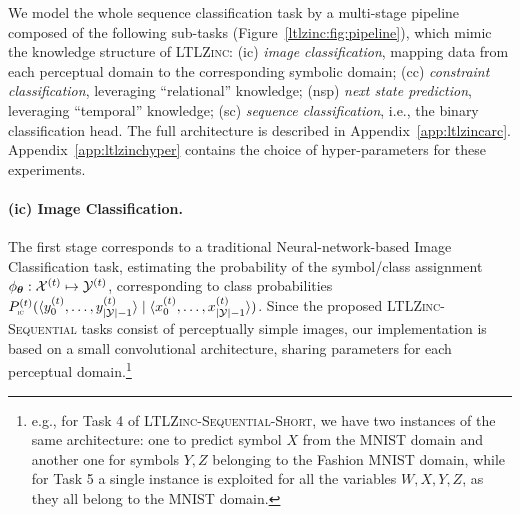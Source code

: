 We model the whole sequence classification task by a multi-stage pipeline composed of the following sub-tasks (Figure~\ref{ltlzinc:fig:pipeline}), which mimic the knowledge structure of \textsc{LTLZinc}: ({\sc\small ic}) \textit{image classification}, mapping data from each perceptual domain to the corresponding symbolic domain; ({\sc\small cc}) \textit{constraint classification}, leveraging ``relational'' knowledge; ({\sc\small nsp}) \textit{next state prediction}, leveraging ``temporal'' knowledge; ({\sc\small sc}) \textit{sequence classification}, i.e., the binary classification head. The full architecture is described in Appendix~\ref{app:ltlzincarc}. Appendix~\ref{app:ltlzinchyper} contains the choice of hyper-parameters for these experiments.

\paragraph{{\sc (ic)} Image Classification.} The first stage corresponds to a traditional Neural-network-based Image Classification task, estimating the probability of the symbol/class assignment $\phi_{\bm{\theta}}: {\mathcal{X}}^{(t)} \mapsto {\mathcal{Y}}^{(t)}$, corresponding to class probabilities $P^{(t)}_{\text{\sc\tiny ic}}(\langle y_{0}^{(t)}, \ldots, y_{|{\mathcal{Y}}|-1}^{(t)}\rangle \mid \langle x_{0}^{(t)}, \ldots, x_{|{\mathcal{Y}}|-1}^{(t)}\rangle)$. 
Since the proposed \textsc{LTLZinc-Sequential} tasks consist of perceptually simple images, our implementation is based on a small convolutional architecture, sharing parameters for each perceptual domain.\footnote{e.g., for Task 4 of \textsc{LTLZinc-Sequential-Short}, we have two instances of the same architecture: one to predict symbol $X$ from the MNIST domain and another one for symbols $Y, Z$ belonging to the Fashion MNIST domain, while for Task 5 a single instance is exploited for all the variables $W, X, Y, Z$, as they all belong to the MNIST domain.}

